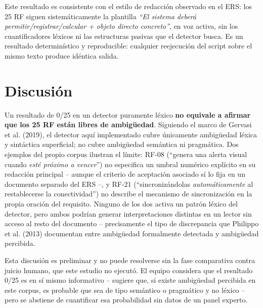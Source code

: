 \documentclass[11pt,a4paper]{article}
\begin{document}
Este resultado es consistente con el estilo de redacci\'on observado en el ERS: los 25 RF siguen sistem\'aticamente la plantilla \emph{``El sistema deber\'a permitir/registrar/calcular + objeto directo concreto''}, en voz activa, sin los cuantificadores l\'exicos ni las estructuras pasivas que el detector busca. Es un resultado determin\'istico y reproducible: cualquier reejecuci\'on del script sobre el mismo texto produce id\'entica salida.

\section{Discusi\'on}

Un resultado de 0/25 en un detector puramente l\'exico \textbf{no equivale a afirmar que los 25 RF est\'an libres de ambig\"uedad}. Siguiendo el marco de Gervasi et al. (2019), el detector aqu\'i implementado cubre \'unicamente ambig\"uedad l\'exica y sint\'actica superficial; no cubre ambig\"uedad sem\'antica ni pragm\'atica. Dos ejemplos del propio corpus ilustran el l\'imite: RF-08 (``genera una alerta visual cuando \emph{est\'e pr\'oximo a vencer}'') no especifica un umbral num\'erico expl\'icito en su redacci\'on principal -- aunque el criterio de aceptaci\'on asociado s\'i lo fija en un documento separado del ERS --, y RF-21 (``sincroniz\'andolas \emph{autom\'aticamente} al restablecerse la conectividad'') no describe el mecanismo de sincronizaci\'on en la propia oraci\'on del requisito. Ninguno de los dos activa un patr\'on l\'exico del detector, pero ambos podr\'ian generar interpretaciones distintas en un lector sin acceso al resto del documento -- precisamente el tipo de discrepancia que Philippo et al. (2013) documentan entre ambig\"uedad formalmente detectada y ambig\"uedad percibida.

Esta discusi\'on es preliminar y no puede resolverse sin la fase comparativa contra juicio humano, que este estudio no ejecut\'o. El equipo considera que el resultado 0/25 es en s\'i mismo informativo -- sugiere que, si existe ambig\"uedad percibida en este corpus, es probable que sea de tipo sem\'antico o pragm\'atico y no l\'exico -- pero se abstiene de cuantificar esa probabilidad sin datos de un panel experto.
\end{document}
